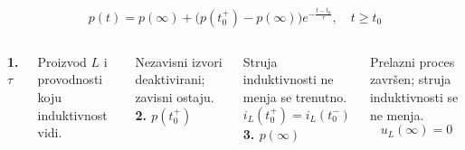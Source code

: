 \begin{frame}[label=08-s065]
\[p(t)=p(\infty)+\bigl(p(t_0^+)-p(\infty)\bigr)e^{-\frac{t-t_0}{\tau}},\quad t\geq t_0\]
\begin{columns}[T,onlytextwidth]
\textbf{\alert{1. $\tau$}}\par\medskip
Proizvod $L$ i provodnosti koju induktivnost vidi.\par
Nezavisni izvori deaktivirani; zavisni ostaju.
\textbf{\alert{2. $p(t_0^+)$}}\par\medskip
Struja induktivnosti ne menja se trenutno.
\[i_L(t_0^+)=i_L(t_0^-)\]
\textbf{\alert{3. $p(\infty)$}}\par\medskip
Prelazni proces završen; struja induktivnosti se ne menja.
\[u_L(\infty)=0\]
\end{columns}
\end{frame}
